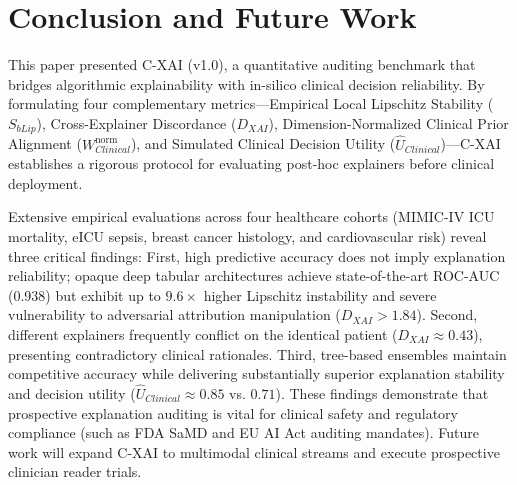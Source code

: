 \documentclass[3p,times,procedia]{elsarticle}
\theoremstyle{definition}
\begin{document}
\section{Conclusion and Future Work}

This paper presented C-XAI (v1.0), a quantitative auditing benchmark that bridges algorithmic explainability with in-silico clinical decision reliability. By formulating four complementary metrics—Empirical Local Lipschitz Stability ($S_{bLip}$), Cross-Explainer Discordance ($D_{XAI}$), Dimension-Normalized Clinical Prior Alignment ($W_{Clinical}^{\mathrm{norm}}$), and Simulated Clinical Decision Utility ($\widehat{U}_{Clinical}$)—C-XAI establishes a rigorous protocol for evaluating post-hoc explainers before clinical deployment.

Extensive empirical evaluations across four healthcare cohorts (MIMIC-IV ICU mortality, eICU sepsis, breast cancer histology, and cardiovascular risk) reveal three critical findings: First, high predictive accuracy does not imply explanation reliability; opaque deep tabular architectures achieve state-of-the-art ROC-AUC (0.938) but exhibit up to $9.6\times$ higher Lipschitz instability and severe vulnerability to adversarial attribution manipulation ($D_{XAI} > 1.84$). Second, different explainers frequently conflict on the identical patient ($D_{XAI} \approx 0.43$), presenting contradictory clinical rationales. Third, tree-based ensembles maintain competitive accuracy while delivering substantially superior explanation stability and decision utility ($\widehat{U}_{Clinical} \approx 0.85$ vs. $0.71$). These findings demonstrate that prospective explanation auditing is vital for clinical safety and regulatory compliance (such as FDA SaMD and EU AI Act auditing mandates). Future work will expand C-XAI to multimodal clinical streams and execute prospective clinician reader trials.
\end{document}
